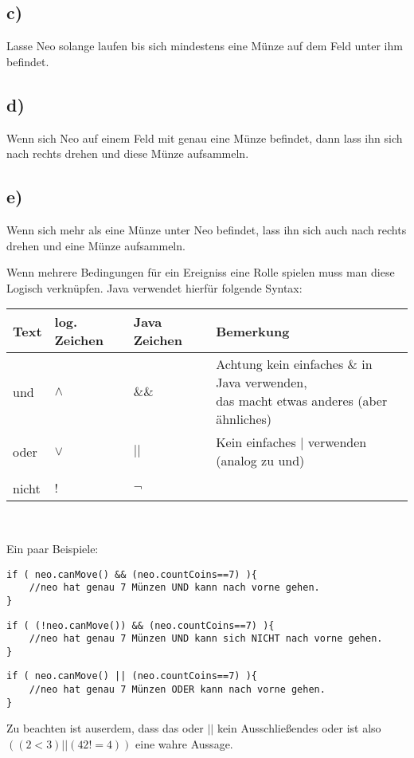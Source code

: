 	\subsection*{c)}
	Lasse Neo solange laufen bis sich mindestens eine Münze auf dem Feld unter ihm befindet.
	\subsection*{d)}
	Wenn sich Neo auf einem Feld mit genau eine Münze befindet, dann lass ihn sich nach rechts drehen und diese Münze aufsammeln.
	\subsection*{e)}
	Wenn sich mehr als eine Münze unter Neo befindet, lass ihn sich auch nach rechts drehen und eine Münze aufsammeln.


\begin{Infobox}
Wenn mehrere Bedingungen für ein Ereigniss eine Rolle spielen muss man diese Logisch verknüpfen. Java verwendet hierfür folgende Syntax:
\begin{center}
        \begin{tabular}{ l | l | l | l}
            Text & log. Zeichen & Java Zeichen &Bemerkung \\
            \hline
            und  &$\land$& $\&\&$& \minibox{Achtung kein einfaches \& in Java verwenden,\\ das macht etwas anderes (aber ähnliches)} \\
            oder  &$\lor$& $||$& Kein einfaches $|$ verwenden (analog zu und) \\
            & &  \\

            nicht & $!$&$\neg$ &\\
    \end{tabular}\\
\end{center}
Ein paar Beispiele:
\begin{lstlisting}
if ( neo.canMove() && (neo.countCoins==7) ){
	//neo hat genau 7 Münzen UND kann nach vorne gehen.
}
\end{lstlisting}

\begin{lstlisting}
if ( (!neo.canMove()) && (neo.countCoins==7) ){
	//neo hat genau 7 Münzen UND kann sich NICHT nach vorne gehen.
}
\end{lstlisting}

\begin{lstlisting}
if ( neo.canMove() || (neo.countCoins==7) ){
	//neo hat genau 7 Münzen ODER kann nach vorne gehen.
}
\end{lstlisting}
Zu beachten ist auserdem, dass das oder $||$ kein Ausschließendes oder ist also\\ $((2 < 3) || (42 != 4))$ eine wahre Aussage.
\end{Infobox}
